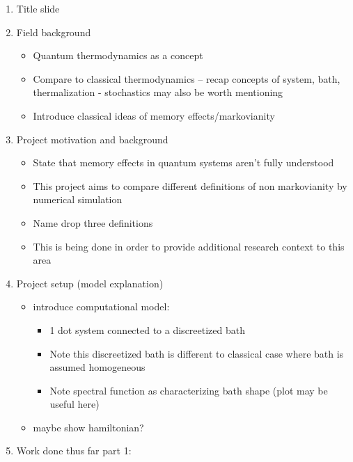 \documentclass[
  letterpaper,
  DIV=11,
  numbers=noendperiod,
  oneside]{scrartcl}
\providecommand{\tightlist}{%
  \setlength{\itemsep}{0pt}\setlength{\parskip}{0pt}}
\begin{document}
\begin{enumerate}
\def\labelenumi{\arabic{enumi}.}
\tightlist
\item
  Title slide
\item
  Field background

  \begin{itemize}
  \tightlist
  \item
    Quantum thermodynamics as a concept\hspace{0pt}
  \item
    Compare to classical thermodynamics -- recap concepts of system,
    bath, thermalization\hspace{0pt} - stochastics may also be worth
    mentioning
  \item
    Introduce classical ideas of memory effects/markovianity\hspace{0pt}
  \end{itemize}
\item
  Project motivation and background

  \begin{itemize}
  \tightlist
  \item
    State that memory effects in quantum systems aren't fully understood
  \item
    This project aims to compare different definitions of non
    markovianity by numerical simulation
  \item
    Name drop three definitions
  \item
    This is being done in order to provide additional research context
    to this area
  \end{itemize}
\item
  Project setup (model explanation)

  \begin{itemize}
  \tightlist
  \item
    introduce computational model:

    \begin{itemize}
    \tightlist
    \item
      1 dot system connected to a discreetized bath
    \item
      Note this discreetized bath is different to classical case where
      bath is assumed homogeneous
    \item
      Note spectral function as characterizing bath shape (plot may be
      useful here)
    \end{itemize}
  \item
    maybe show hamiltonian?
  \end{itemize}
\item
  Work done thus far part 1:


\end{enumerate}
\end{document}
